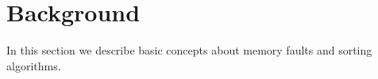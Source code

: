 \section{Background}

In this section we describe basic concepts about memory faults and sorting algorithms.



